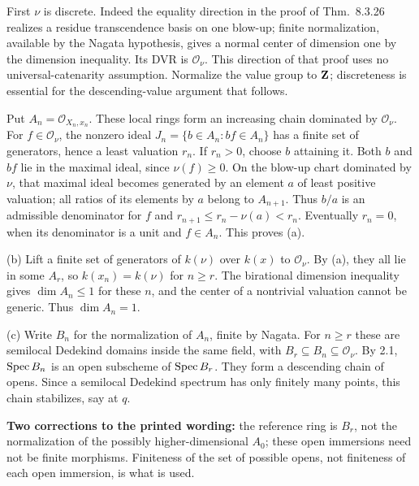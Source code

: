 \documentclass[11pt]{article}
\let\chapterexercise\exercise
\renewcommand{\exercise}[2]{\Needspace{8\baselineskip}\chapterexercise{#1}{#2}}
\begin{document}
\pf
First $\nu$ is discrete. Indeed the equality direction in the proof of Thm.~8.3.26 realizes a residue transcendence basis on one blow-up; finite normalization, available by the Nagata hypothesis, gives a normal center of dimension one by the dimension inequality. Its DVR is $\mathcal O_\nu$. This direction of that proof uses no universal-catenarity assumption. Normalize the value group to $\mathbf Z$; discreteness is essential for the descending-value argument that follows.

Put $A_n=\mathcal O_{X_n,x_n}$. These local rings form an increasing chain dominated by $\mathcal O_\nu$. For $f\in\mathcal O_\nu$, the nonzero ideal $J_n=\{b\in A_n:bf\in A_n\}$ has a finite set of generators, hence a least valuation $r_n$. If $r_n>0$, choose $b$ attaining it. Both $b$ and $bf$ lie in the maximal ideal, since $\nu(f)\ge0$. On the blow-up chart dominated by $\nu$, that maximal ideal becomes generated by an element $a$ of least positive valuation; all ratios of its elements by $a$ belong to $A_{n+1}$. Thus $b/a$ is an admissible denominator for $f$ and $r_{n+1}\le r_n-\nu(a)<r_n$. Eventually $r_n=0$, when its denominator is a unit and $f\in A_n$. This proves (a).

(b) Lift a finite set of generators of $k(\nu)$ over $k(x)$ to $\mathcal O_\nu$. By (a), they all lie in some $A_r$, so $k(x_n)=k(\nu)$ for $n\ge r$. The birational dimension inequality gives $\dim A_n\le1$ for these $n$, and the center of a nontrivial valuation cannot be generic. Thus $\dim A_n=1$.

(c) Write $B_n$ for the normalization of $A_n$, finite by Nagata. For $n\ge r$ these are semilocal Dedekind domains inside the same field, with $B_r\subseteq B_n\subseteq\mathcal O_\nu$. By 2.1, $\operatorname{Spec} B_n$ is an open subscheme of $\operatorname{Spec} B_r$. They form a descending chain of opens. Since a semilocal Dedekind spectrum has only finitely many points, this chain stabilizes, say at $q$.

\textbf{Two corrections to the printed wording:} the reference ring is $B_r$, not the normalization of the possibly higher-dimensional $A_0$; these open immersions need not be finite morphisms. Finiteness of the set of possible opens, not finiteness of each open immersion, is what is used.
\end{document}
